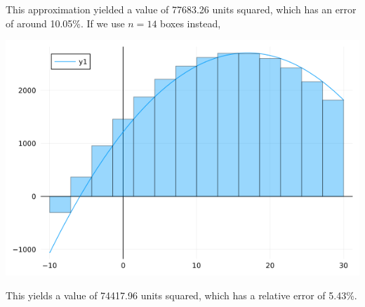 \documentclass[12pt]{article}
\begin{document}
    This approximation yielded a value of 77683.26 units squared, which has an error of around 10.05\%. 
    If we use $n=14$ boxes instead, 
    \begin{center}
        \includegraphics*[scale=0.45]{images/RRAM_2.png}
    \end{center}
    This yields a value of 74417.96 units squared, which has a relative error of 5.43\%.
\end{document}
